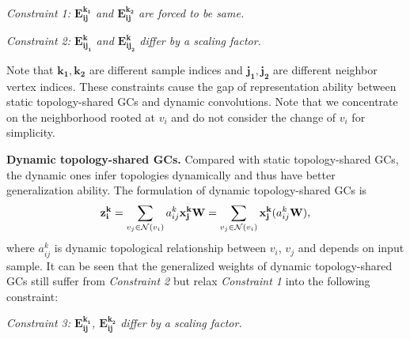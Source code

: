 \documentclass[10pt,twocolumn,letterpaper]{article}
\begin{document}
\noindent \textit{Constraint 1: $\mathbf{E^{k_1}_{ij}}$ and $\mathbf{E^{k_2}_{ij}}$ are forced to be same.}

\noindent \textit{Constraint 2: $\mathbf{E^k_{ij_1}}$ and $\mathbf{E^k_{ij_2}}$ differ by a scaling factor.}

Note that $\mathbf{k_1}, \mathbf{k_2}$ are different sample indices and $\mathbf{j_1},\mathbf{j_2}$ are different neighbor vertex indices. These constraints cause the gap of representation ability between static topology-shared GCs and dynamic convolutions. Note that we concentrate on the neighborhood rooted at $v_i$ and do not consider the change of $v_i$ for simplicity.



\noindent \textbf{Dynamic topology-shared GCs.} Compared with static topology-shared GCs, the dynamic ones infer topologies dynamically and thus have better generalization ability. The formulation of dynamic topology-shared GCs is
\vspace{-0.15cm}
\begin{equation}
\vspace{-0.15cm}
\mathbf{z_i^k}=\sum_{v_j \in \mathcal{N}(v_i)}a_{ij}^k\mathbf{x_j^k}\mathbf{W}\\
=\sum_{v_j \in \mathcal{N}(v_i)}\mathbf{x_j^k}(a_{ij}^k\mathbf{W}),
\label{equ:dynamic_shared_gc}
\end{equation}
where $a_{ij}^k$ is dynamic topological relationship between $v_i$, $v_j$ and depends on input sample. It can be seen that the generalized weights of dynamic topology-shared GCs still suffer from \textit{Constraint 2} but relax \textit{Constraint 1} into the following constraint:

\noindent \textit{Constraint 3: $\mathbf{E^{k_1}_{ij}}$, $\mathbf{E^{k_2}_{ij}}$ differ by a scaling factor.}
\end{document}
